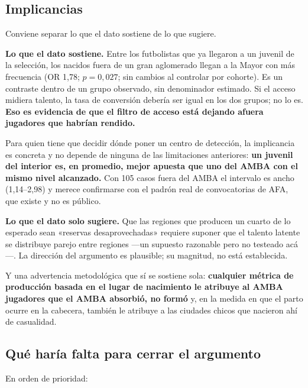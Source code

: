 \documentclass[11pt,a4paper]{article}
\begin{document}
\subsection{Implicancias}

Conviene separar lo que el dato sostiene de lo que sugiere.

\textbf{Lo que el dato sostiene.} Entre los futbolistas que ya llegaron a un
juvenil de la selección, los nacidos fuera de un gran aglomerado llegan a la
Mayor con más frecuencia (OR 1,78; $p = 0{,}027$; sin cambios al controlar por
cohorte). Es un contraste dentro de un grupo observado, sin denominador estimado.
Si el acceso midiera talento, la tasa de conversión debería ser igual en los dos
grupos; no lo es. \textbf{Eso es evidencia de que el filtro de acceso está
dejando afuera jugadores que habrían rendido.}

Para quien tiene que decidir dónde poner un centro de detección, la implicancia
es concreta y no depende de ninguna de las limitaciones anteriores: \textbf{un
juvenil del interior es, en promedio, mejor apuesta que uno del AMBA con el mismo
nivel alcanzado.} Con 105 casos fuera del AMBA el intervalo es ancho
(1,14--2,98) y merece confirmarse con el padrón real de convocatorias de AFA, que
existe y no es público.

\textbf{Lo que el dato solo sugiere.} Que las regiones que producen un cuarto de
lo esperado sean «reservas desaprovechadas» requiere suponer que el talento
latente se distribuye parejo entre regiones —un supuesto razonable pero no
testeado acá—. La dirección del argumento es plausible; su magnitud, no está
establecida.

Y una advertencia metodológica que sí se sostiene sola: \textbf{cualquier métrica
de producción basada en el lugar de nacimiento le atribuye al AMBA jugadores que
el AMBA absorbió, no formó} y, en la medida en que el parto ocurre en la
cabecera, también le atribuye a las ciudades chicos que nacieron ahí de
casualidad.

\subsection{Qué haría falta para cerrar el argumento}

En orden de prioridad:
\end{document}
